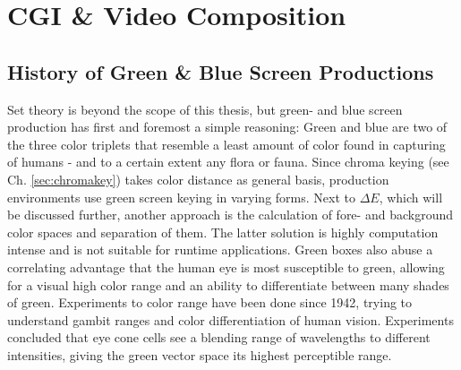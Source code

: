 \section{CGI \& Video Composition}

\subsection{History of Green \& Blue Screen Productions}

Set theory is beyond the scope of this thesis, but green- and blue screen 
production has first and foremost a simple reasoning: Green and blue are two of 
the three color triplets that resemble a least amount of color found in 
capturing of humans - and to a certain extent any flora or fauna. Since chroma 
keying (see Ch. \ref{sec:chromakey}) takes color distance as general basis, 
production environments use green screen keying in varying forms. Next to 
$\Delta E$, which will be discussed further, another approach is the 
calculation of fore- and background color spaces and separation of them. The 
latter solution is highly computation intense and is not suitable for runtime 
applications. \cite{disney:unmixing:2017}
\newline
Green boxes also abuse a correlating advantage that the human eye is most 
susceptible to green, allowing for a visual high color range and an ability to 
differentiate between many shades of green. Experiments to color range have 
been done since 1942, trying to understand gambit ranges and color 
differentiation of human vision. Experiments concluded that eye cone cells see 
a blending range of wavelengths to different intensities, giving the green 
vector space its highest perceptible range. \cite{MacAdam:1942}

